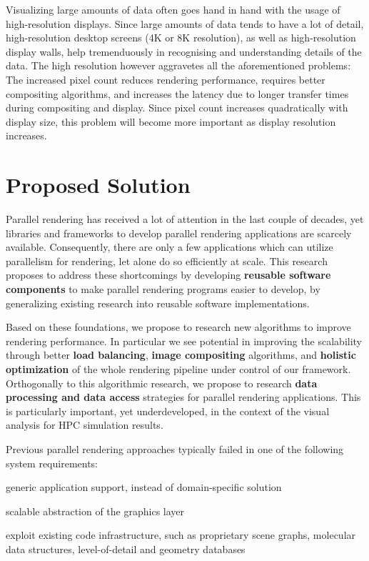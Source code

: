  Visualizing large amounts of data often goes hand in hand with the usage of
 high-resolution displays. Since large amounts of data tends to have a lot of
 detail, high-resolution desktop screens (4K or 8K resolution), as well as
 high-resolution display walls, help tremenduously in recognising and
 understanding details of the data. The high resolution however aggravetes all
 the aforementioned problems: The increased pixel count reduces rendering
 performance, requires better compositing algorithms, and increases the latency
 due to longer transfer times during compositing and display. Since pixel count
 increases quadratically with display size, this problem will become more
 important as display resolution increases.

 \chapter{Proposed Solution} %

 Parallel rendering has received a lot of attention in the last couple of
 decades, yet libraries and frameworks to develop parallel rendering applications
 are scarcely available. Consequently, there are only a few applications which
 can utilize parallelism for rendering, let alone do so efficiently at scale.
 This research proposes to address these shortcomings by developing {\bf reusable
   software components} to make parallel rendering programs easier to develop, by
 generalizing existing research into reusable software implementations.

 Based on these foundations, we propose to research new algorithms to improve
 rendering performance. In particular we see potential in improving the
 scalability through better {\bf load balancing}, {\bf image compositing}
 algorithms, and {\bf holistic optimization} of the whole rendering pipeline
 under control of our framework. Orthogonally to this algorithmic research, we
 propose to research {\bf data processing and data access} strategies for
 parallel rendering applications. This is particularly important, yet
 underdeveloped, in the context of the visual analysis for HPC simulation
 results.

 Previous parallel rendering approaches typically failed in one of the following
 system requirements:
 \begin{compactenum}
  \item generic application support, instead of domain-specific solution
  \item scalable abstraction of the graphics layer
  \item exploit existing code infrastructure, such as proprietary scene graphs, molecular data structures, level-of-detail and geometry databases
 \end{compactenum}


